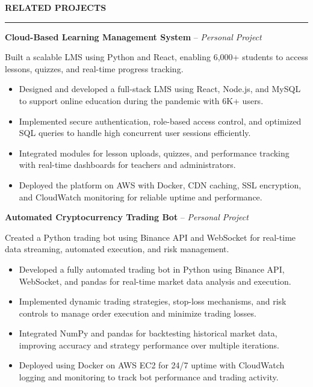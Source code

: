 \documentclass[10pt,letterpaper]{article}
\begin{document}
\vspace{6pt}

\textbf{RELATED PROJECTS}\\[-8pt]
\noindent\rule{\textwidth}{1pt}

\vspace{-2pt}

\textbf{Cloud-Based Learning Management System} -- \emph{Personal Project}

\vspace{-1pt}

Built a scalable LMS using Python and React, enabling 6,000+ students to access lessons, quizzes, and real-time progress tracking.
\vspace{-1pt}
\begin{itemize}
\item Designed and developed a full-stack LMS using React, Node.js, and MySQL to support online education during the pandemic with 6K+ users.
\item Implemented secure authentication, role-based access control, and optimized SQL queries to handle high concurrent user sessions efficiently.
\item Integrated modules for lesson uploads, quizzes, and performance tracking with real-time dashboards for teachers and administrators.
\item Deployed the platform on AWS with Docker, CDN caching, SSL encryption, and CloudWatch monitoring for reliable uptime and performance.
\end{itemize}

\textbf{Automated Cryptocurrency Trading Bot} -- \emph{Personal Project}

\vspace{-1pt}

Created a Python trading bot using Binance API and WebSocket for real-time data streaming, automated execution, and risk management.
\vspace{-1pt}
\begin{itemize}
\item Developed a fully automated trading bot in Python using Binance API, WebSocket, and pandas for real-time market data analysis and execution.
\item Implemented dynamic trading strategies, stop-loss mechanisms, and risk controls to manage order execution and minimize trading losses.
\item Integrated NumPy and pandas for backtesting historical market data, improving accuracy and strategy performance over multiple iterations.
\item Deployed using Docker on AWS EC2 for 24/7 uptime with CloudWatch logging and monitoring to track bot performance and trading activity.
\end{itemize}
\end{document}
